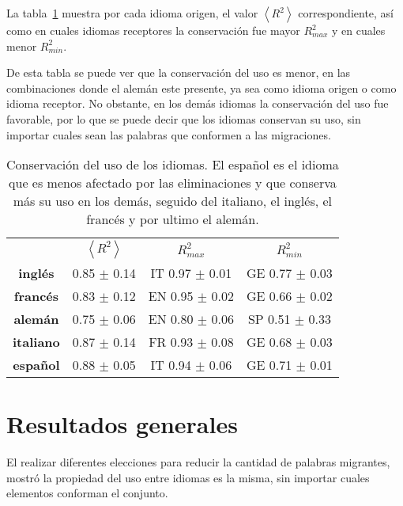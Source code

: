 La tabla~\ref{tab.conservacion} muestra por cada idioma origen,  el valor  $\left \langle R^{2}  \right \rangle$ correspondiente, así como  en cuales idiomas receptores la conservación fue mayor $R^{2}_{max}$ y  en cuales menor $R^{2}_{min}$.  

De esta tabla se puede ver que la conservación del uso es menor, en las combinaciones donde el alemán este presente, ya sea como idioma origen o como idioma receptor. No obstante, en los demás idiomas la conservación del uso fue favorable, por lo que se puede decir que los idiomas conservan su uso, sin importar  cuales sean las palabras que conformen a las migraciones. 


 



\begin{table}
	\centering
	\begin{tabular}{cccc}
		\textbf{} & \textbf{$\left \langle R^{2} \right \rangle$} & \textbf{$R^{2}_{max}$} & \textbf{$R^{2}_{min}$} \\
		\textbf{inglés}   & 0.85 $\pm$ 0.14   &  IT 0.97 $\pm$ 0.01  & GE 0.77 $\pm$ 0.03  \\
		\textbf{francés}  & 0.83 $\pm$ 0.12   &  EN 0.95 $\pm$ 0.02  & GE 0.66 $\pm$ 0.02  \\
		\textbf{alemán}   & 0.75 $\pm$ 0.06   &  EN 0.80 $\pm$ 0.06  & SP 0.51 $\pm$ 0.33  \\
		\textbf{italiano} & 0.87 $\pm$ 0.14   &  FR 0.93 $\pm$ 0.08  & GE 0.68 $\pm$ 0.03  \\
		\textbf{español}  & 0.88 $\pm$ 0.05   &  IT 0.94 $\pm$ 0.06  & GE 0.71 $\pm$ 0.01                                                               
	\end{tabular}
	\caption{Conservación del uso de los idiomas. El español es el idioma que es menos afectado por las eliminaciones y que conserva más su uso en los demás, seguido del italiano, el inglés, el francés y por ultimo el alemán.}
	\label{tab.conservacion}
\end{table}





\section{Resultados generales}

El realizar diferentes elecciones para reducir la cantidad de palabras migrantes, mostró la propiedad del uso entre idiomas es la misma, sin importar cuales elementos conforman el conjunto.

